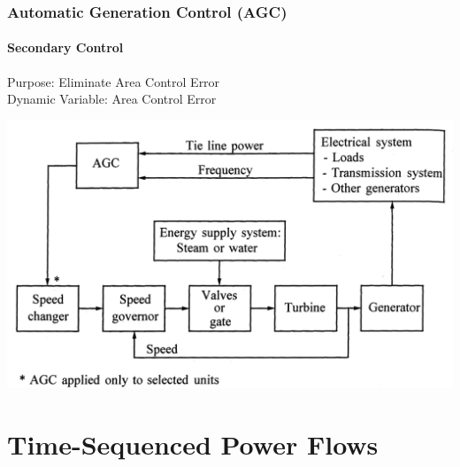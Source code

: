 \documentclass[14pt, unknownkeysallowed]{beamer}
\begin{document}
\begin{frame}
\frametitle{Automatic Generation Control {\scriptsize(AGC)}}
\framesubtitle{Secondary Control}

Purpose: Eliminate Area Control Error\\
\vspace{.5em}
Dynamic Variable: Area Control Error \\

\begin{center}
\includegraphics[height=.55\textheight]{AGCblockdiagram}
{\tiny\cite{Kundur}}
\end{center}
\end{frame}


\section{Time-Sequenced Power Flows}
\end{document}
